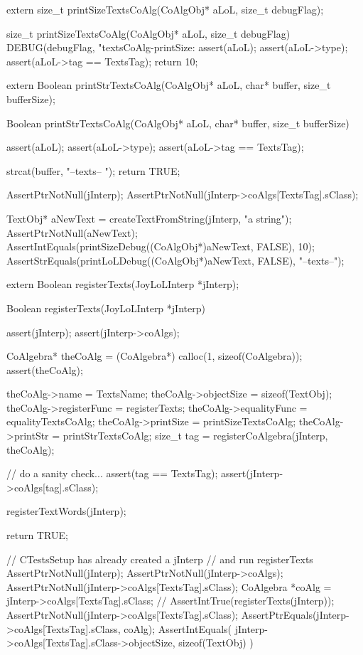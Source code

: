 
\startCHeader
extern size_t printSizeTextsCoAlg(CoAlgObj* aLoL, size_t debugFlag);
\stopCHeader

\startCCode
size_t printSizeTextsCoAlg(CoAlgObj* aLoL, size_t debugFlag) {
  DEBUG(debugFlag, "textsCoAlg-printSize: %
  assert(aLoL);
  assert(aLoL->type);
  assert(aLoL->tag == TextsTag);
  return 10;
}
\stopCCode

\startCHeader
extern Boolean printStrTextsCoAlg(CoAlgObj* aLoL,
                                 char* buffer, size_t bufferSize);
\stopCHeader

\startCCode
Boolean printStrTextsCoAlg(CoAlgObj* aLoL,
                          char* buffer, size_t bufferSize) {
  assert(aLoL);
  assert(aLoL->type);
  assert(aLoL->tag == TextsTag);

  strcat(buffer, "--texts-- ");
  return TRUE;
}
\stopCCode


\startCTest
  AssertPtrNotNull(jInterp);
  AssertPtrNotNull(jInterp->coAlgs[TextsTag].sClass);

  TextObj* aNewText = createTextFromString(jInterp, "a string");
  AssertPtrNotNull(aNewText);
  AssertIntEquals(printSizeDebug((CoAlgObj*)aNewText, FALSE), 10);
  AssertStrEquals(printLoLDebug((CoAlgObj*)aNewText, FALSE), "--texts--");
\stopCTest
\stopTestCase
\stopTestSuite

\startTestSuite[registerTexts]

\startCHeader
extern Boolean registerTexts(JoyLoLInterp *jInterp);
\stopCHeader

\startCCode
Boolean registerTexts(JoyLoLInterp *jInterp) {
  assert(jInterp);
  assert(jInterp->coAlgs);
  
  CoAlgebra* theCoAlg    = (CoAlgebra*) calloc(1, sizeof(CoAlgebra));
  assert(theCoAlg);
  
  theCoAlg->name         = TextsName;
  theCoAlg->objectSize   = sizeof(TextObj);
  theCoAlg->registerFunc = registerTexts;
  theCoAlg->equalityFunc = equalityTextsCoAlg;
  theCoAlg->printSize    = printSizeTextsCoAlg;
  theCoAlg->printStr     = printStrTextsCoAlg;
  size_t tag = registerCoAlgebra(jInterp, theCoAlg);
  
  // do a sanity check...
  assert(tag == TextsTag);
  assert(jInterp->coAlgs[tag].sClass);
  
  registerTextWords(jInterp);
  
  return TRUE;
}
\stopCCode


\startCTest
  // CTestsSetup has already created a jInterp
  // and run registerTexts
  AssertPtrNotNull(jInterp);
  AssertPtrNotNull(jInterp->coAlgs);
  AssertPtrNotNull(jInterp->coAlgs[TextsTag].sClass);
  CoAlgebra *coAlg = jInterp->coAlgs[TextsTag].sClass;
//  AssertIntTrue(registerTexts(jInterp));
  AssertPtrNotNull(jInterp->coAlgs[TextsTag].sClass);
  AssertPtrEquals(jInterp->coAlgs[TextsTag].sClass, coAlg);
  AssertIntEquals(
    jInterp->coAlgs[TextsTag].sClass->objectSize,
    sizeof(TextObj)
  )
\stopCTest
\stopTestCase
\stopTestSuite
